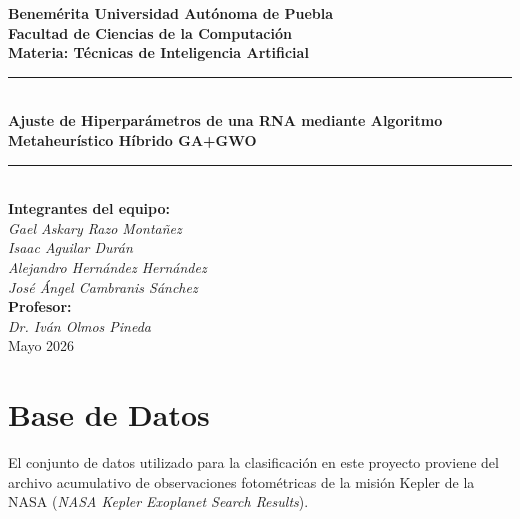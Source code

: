 \documentclass[12pt, letterpaper]{article}
\begin{document}
\begin{titlepage}
    \centering
    \vspace*{1cm}
    
    {\Large\textbf{Benemérita Universidad Autónoma de Puebla}}\\[0.5cm]
    {\large\textbf{Facultad de Ciencias de la Computación}}\\[1.5cm]
    
    {\large\textbf{Materia: Técnicas de Inteligencia Artificial}}\\[1cm]
    
    \rule{\linewidth}{0.5mm} \\[0.5cm]
    {\LARGE\textbf{Ajuste de Hiperparámetros de una RNA mediante Algoritmo Metaheurístico Híbrido GA+GWO}}\\[0.5cm]
    \rule{\linewidth}{0.5mm} \\[2cm]
    
    \textbf{Integrantes del equipo:}\\
    \vspace{0.3cm}
    \textit{Gael Askary Razo Montañez}\\
    \textit{Isaac Aguilar Durán}\\
    \textit{Alejandro Hernández Hernández}\\
    \textit{José Ángel Cambranis Sánchez}\\[1cm]
    
    \textbf{Profesor:}\\
    \vspace{0.1cm}
    \textit{Dr. Iván Olmos Pineda}\\[1cm]
    
    \vfill
    {\large Mayo 2026}
\end{titlepage}

\newpage
\tableofcontents
\vspace{1cm}
\listoffigures
\vspace{1cm}
\listoftables
\newpage

\section{Base de Datos}
El conjunto de datos utilizado para la clasificación en este proyecto proviene del archivo acumulativo de observaciones fotométricas de la misión Kepler de la NASA (\textit{NASA Kepler Exoplanet Search Results}).
\end{document}
